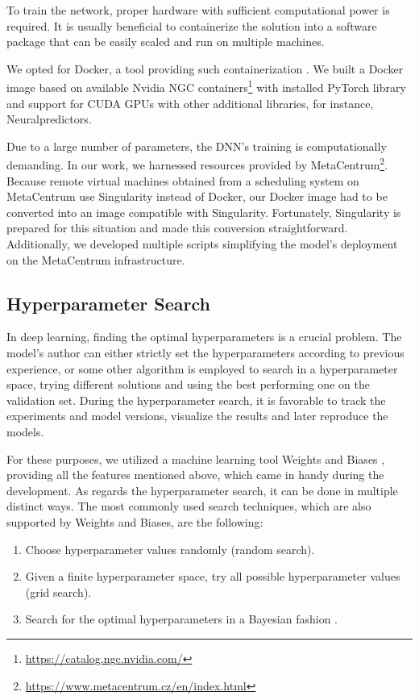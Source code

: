 To train the network, proper hardware with sufficient computational power is required. It is usually beneficial to containerize the solution into a software package that can be easily scaled and run on multiple machines.

We opted for Docker, a tool providing such containerization \citep{merkel2014docker}. We built a Docker image based on available Nvidia NGC containers\footnote{\url{https://catalog.ngc.nvidia.com/}} with installed PyTorch library and support for CUDA GPUs \citep{cuda} with other additional libraries, for instance, Neuralpredictors.

Due to a large number of parameters, the DNN’s training is computationally demanding. In our work, we harnessed resources provided by MetaCentrum\footnote{\url{https://www.metacentrum.cz/en/index.html}}. Because remote virtual machines obtained from a scheduling system on MetaCentrum use Singularity \citep{kurtzer2017singularity} instead of Docker, our Docker image had to be converted into an image compatible with Singularity. Fortunately, Singularity is prepared for this situation and made this conversion straightforward. Additionally, we developed multiple scripts simplifying the model’s deployment on the MetaCentrum infrastructure. 

\subsection{Hyperparameter Search}

In deep learning, finding the optimal hyperparameters is a crucial problem. The model’s author can either strictly set the hyperparameters according to previous experience, or some other algorithm is employed to search in a hyperparameter space, trying different solutions and using the best performing one on the validation set. During the hyperparameter search, it is favorable to track the experiments and model versions, visualize the results and later reproduce the models.


For these purposes, we utilized a machine learning tool Weights and Biases \citep{biewald2020experiment}, providing all the features mentioned above, which came in handy during the development. As regards the hyperparameter search, it can be done in multiple distinct ways. The most commonly used search techniques, which are also supported by Weights and Biases, are the following:
\begin{enumerate}
	\item Choose hyperparameter values randomly (random search).
	\item Given a finite hyperparameter space, try all possible hyperparameter values (grid search).
	\item Search for the optimal hyperparameters in a Bayesian fashion \citep{snoek2012practical}.
	
\end{enumerate}

